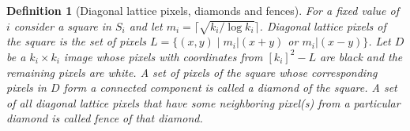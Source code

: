 \documentclass[11pt,english]{article}
\newtheorem{definition}{Definition}[section]
\numberwithin{figure}{section}
\begin{document}
\begin{definition}[Diagonal lattice pixels, diamonds and fences]
\label{def:diagonal_lattice_pixels_and_regions}
For a fixed value of $i$ consider a square in $S_{i}$ and let
$m_{i}=\lceil\sqrt{k_{i}/\log k_{i}}\rceil$. \emph{Diagonal lattice pixels} of
the square is the set of pixels $L=\{(x,y)\mid m_{i}|(x+y)$ or $m_{i}|(x-y)\}$. Let
$D$ be a $k_{i}\times k_{i}$ image whose pixels with coordinates from $[k_{i}]^{2}-L$ are black and the remaining pixels are white.
A set of pixels of the square whose corresponding pixels
in $D$ form a connected component is called a \emph{diamond} of the square.
A set of all diagonal lattice pixels that have some neighboring
pixel(s) from a particular diamond is called \emph{fence} of that diamond.
\end{definition}
\end{document}
